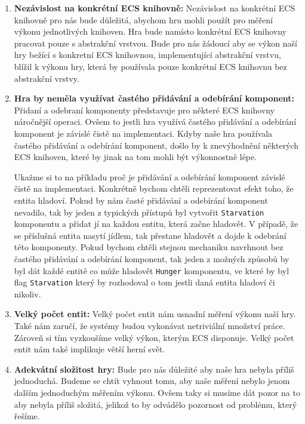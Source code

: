\begin{enumerate}
    \item \textbf{Nezávislost na konkrétní ECS knihovně:} Nezávislost na konkrétní ECS knihovně pro nás bude důležitá, abychom hru mohli použít pro měření výkonu jednotlivých knihoven. Hra bude namísto konkrétní ECS knihovny pracovat pouze s abstrakční vrstvou. Bude pro nás žádoucí aby se výkon naší hry bežící s konkretní ECS knihovnou, implementující abstrakční vrstvu, blížil k výkonu hry, která by používala pouze konkrétní ECS knihovnu bez abstrakční vrstvy.

    \item \textbf{Hra by neměla využívat častého přidávání a odebírání komponent:} Přidaní a odebraní komponenty představuje pro některé ECS knihovny náročnější operaci. Ovšem to jestli hra využívá častého přidávání a odebírání komponent je závislé čistě na implementaci. Kdyby naše hra používala častého přidávání a odebírání komponent, došlo by k znevýhodnění některých ECS knihoven, které by jinak na tom mohli být výkonnostně lépe.
    
    Ukažme si to na příkladu proč je přidávání a odebírání komponent závislé čistě na implementaci. Konkrétně bychom chtěli reprezentovat efekt toho, že entita hladoví. Pokud by nám časté přidávání a odebírání komponent nevadilo, tak by jeden z typických přístupů byl vytvořit \verb|Starvation| komponentu a přidat jí na každou entitu, která začne hladovět. V případě, že se příslušná entita nasytí jídlem, tak přestane hladovět a dojde k odebrání této komponenty. Pokud bychom chtěli stejnou mechaniku navrhnout bez častého přidávání a odebírání komponent, tak jeden z možných způsobů by byl dát každé entitě co může hladovět \texttt{Hunger} komponentu, ve které by byl flag \verb|Starvation| který by rozhodoval o tom jestli daná entita hladoví či nikoliv.
    
    \item \textbf{Velký počet entit:} Velký počet entit nám usnadní měření výkonu naší hry. Také nám zaručí, že systémy budou vykonávat netriviální množství práce. Zároveň si tím vyzkoušíme velký výkon, kterým ECS disponuje. Velký počet entit nám také implikuje větší herní svět.
    
    \item \textbf{Adekvátní složitost hry:} Bude pro nás důležité aby naše hra nebyla příliš jednoduchá. Budeme se chtít vyhnout tomu, aby naše měření nebylo jenom dalším jednoduchým měřením výkonu. Ovšem taky si musíme dát pozor na to aby nebyla příliš složitá, jelikož to by odvádělo pozornost od problému, který řešíme.
\end{enumerate}


